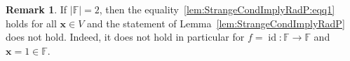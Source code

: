 \documentclass{elsarticle}
\DeclareMathOperator{\id}{id}
\def\F{{\mathbb F}}
\newtheorem{lemma}[theorem]{Lemma}
\theoremstyle{definition}
\newtheorem{remark}[theorem]{Remark}
\numberwithin{equation}{section}
\begin{document}
\begin{remark}
 If $|\F| = 2$, then the equality~\eqref{lem:StrangeCondImplyRadP:eqq1} holds for all $\mathbf x \in V$ and the statement of Lemma~\ref{lem:StrangeCondImplyRadP} does not hold. Indeed, it does not hold in particular for $f = \id \colon \F \to \F$ and $\mathbf x = 1 \in \F$.
\end{remark}
%
%
\end{document}
